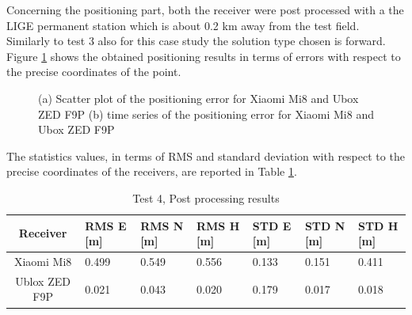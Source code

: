 Concerning the positioning part, both the receiver were post processed with a the LIGE permanent station which is about 0.2 km away from the test field. Similarly to test 3 also for this case study the solution type chosen is forward. Figure \ref{FIG:test4_pp} shows the obtained positioning results in terms of errors with respect to the precise coordinates of the point.

\begin{figure}[H] 
	\centering
    \caption{(a) Scatter plot of the positioning error for Xiaomi Mi8 and Ubox ZED F9P  (b) time series of the positioning error for Xiaomi Mi8 and Ubox ZED F9P}
	\label{FIG:test4_pp} 
\end{figure}

The statistics values, in terms of RMS and standard deviation with respect to the precise coordinates of the receivers, are reported in Table \ref{tab:test4_pp}.

\begin{table}[H]
	\centering
	\begin{tabular}{|c|p{1.5cm}|p{1.5cm}|p{1.5cm}|p{1.5cm}|p{1.5cm}|p{1.5cm}|}
	\hline
	\textbf{Receiver} & \textbf{RMS E [m]} & \textbf{RMS N [m]} &
	\textbf{RMS H [m]} &\textbf{STD E [m]}&\textbf{STD N [m]}&\textbf{STD H [m]}\\
    \hline
	Xiaomi Mi8 & 0.499 &0.549 &0.556  &0.133 & 0.151&0.411\\  
    \hline
	Ublox ZED F9P & 0.021 & 0.043 & 0.020&0.179&0.017&0.018\\ \hline
	\end{tabular} 
	\caption{Test 4, Post processing results}
	\label{tab:test4_pp}
\end{table}

